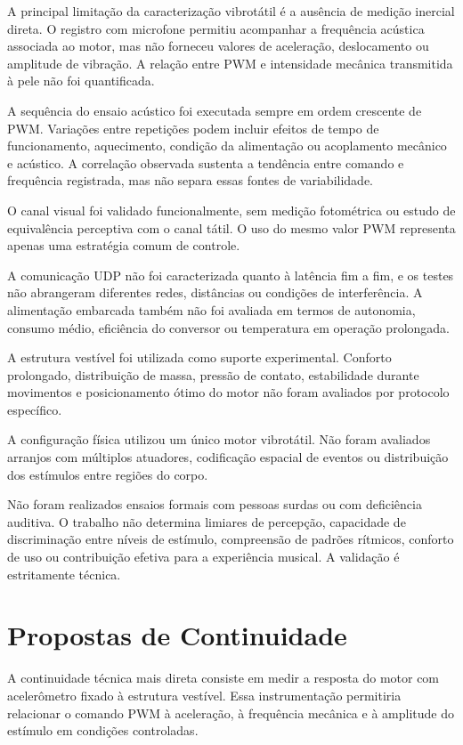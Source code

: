 A principal limitação da caracterização vibrotátil é a ausência de medição inercial direta. O registro com microfone permitiu acompanhar a frequência acústica associada ao motor, mas não forneceu valores de aceleração, deslocamento ou amplitude de vibração. A relação entre PWM e intensidade mecânica transmitida à pele não foi quantificada.

A sequência do ensaio acústico foi executada sempre em ordem crescente de PWM. Variações entre repetições podem incluir efeitos de tempo de funcionamento, aquecimento, condição da alimentação ou acoplamento mecânico e acústico. A correlação observada sustenta a tendência entre comando e frequência registrada, mas não separa essas fontes de variabilidade.

O canal visual foi validado funcionalmente, sem medição fotométrica ou estudo de equivalência perceptiva com o canal tátil. O uso do mesmo valor PWM representa apenas uma estratégia comum de controle.

A comunicação UDP não foi caracterizada quanto à latência fim a fim, e os testes não abrangeram diferentes redes, distâncias ou condições de interferência. A alimentação embarcada também não foi avaliada em termos de autonomia, consumo médio, eficiência do conversor ou temperatura em operação prolongada.

A estrutura vestível foi utilizada como suporte experimental. Conforto prolongado, distribuição de massa, pressão de contato, estabilidade durante movimentos e posicionamento ótimo do motor não foram avaliados por protocolo específico.

A configuração física utilizou um único motor vibrotátil. Não foram avaliados arranjos com múltiplos atuadores, codificação espacial de eventos ou distribuição dos estímulos entre regiões do corpo.

Não foram realizados ensaios formais com pessoas surdas ou com deficiência auditiva. O trabalho não determina limiares de percepção, capacidade de discriminação entre níveis de estímulo, compreensão de padrões rítmicos, conforto de uso ou contribuição efetiva para a experiência musical. A validação é estritamente técnica.

\section{Propostas de Continuidade}
\label{sec:propostas_continuidade}

A continuidade técnica mais direta consiste em medir a resposta do motor com acelerômetro fixado à estrutura vestível. Essa instrumentação permitiria relacionar o comando PWM à aceleração, à frequência mecânica e à amplitude do estímulo em condições controladas.

